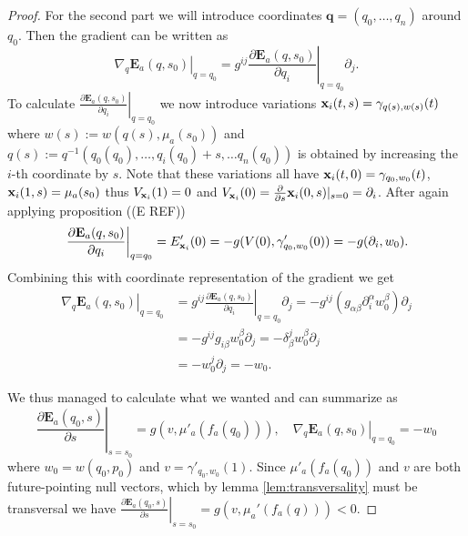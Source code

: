 \begin{proof}
    For the second part we will introduce coordinates $\mathbf{q}=(q_0,\dots,q_n)$ around $q_0$. Then the gradient can be written as
    \[
        \left.\nabla_q\mathbf{E}_a(q,s_0)\right\rvert_{q=q_0} = g^{ij}\left.\frac{\partial\mathbf{E}_a(q,s_0)}{\partial q_i}\right\rvert_{q=q_0}\partial_j.
    \]
    To calculate $\left.\frac{\partial\mathbf{E}_a(q,s_0)}{\partial q_i}\right\rvert_{q=q_0}$ we now introduce variations $\mathbf{x}_i(t,s) = \gamma_{q(s),w(s)}(t)$ where $w(s):=w(q(s),\mu_a(s_0))$ and $q(s):=q^{-1}(q_0(q_0),\dots, q_i(q_0)+s, \dots q_n(q_0))$ is obtained by increasing the $i$-th coordinate by $s$. Note that these variations all have $\mathbf{x}_i(t,0) = \gamma_{q_0,w_0}(t)$, $\mathbf{x}_i(1,s) = \mu_a(s_0)$ thus $V_{\mathbf{x}_i}(1)=0$ and $V_{\mathbf{x}_i}(0) = \frac{\partial}{\partial s}\mathbf{x}_i(0,s)\rvert_{s=0} = \partial_i$.
    After again applying proposition ((E REF))
    \[
        \left.\frac{\partial\mathbf{E}_a(q,s_0)}{\partial q_i}\right\rvert_{q=q_0} = E'_{\mathbf{x}_i}(0) =  -g(V(0),\gamma'_{q_0,w_0}(0)) = -g(\partial_i,w_0).
    \]
    Combining this with coordinate representation of the gradient we get
    \begin{align*}
        \left.\nabla_q\mathbf{E}_a(q,s_0)\right\rvert_{q=q_0} &= g^{ij}\left.\frac{\partial\mathbf{E}_a(q,s_0)}{\partial q_i}\right\rvert_{q=q_0}\partial_j = -g^{ij}(g_{\alpha\beta}\partial_i^\alpha w_0^\beta)\partial_j\\
        &= -g^{ij}g_{i\beta}w_0^\beta\partial_j = -\delta^j_\beta w_0^\beta \partial_j\\
        &= -w_0^j\partial_j = -w_0.
    \end{align*}
    
    We thus managed to calculate what we wanted and can summarize as
    \begin{equation}\label{eq:dEsummary}
        \left.\frac{\partial\mathbf{E}_a(q_0,s)}{\partial s}\right\rvert_{s=s_0} = g(v,\mu'_a(f_a(q_0))), \quad \left.\nabla_q\mathbf{E}_a(q,s_0)\right\rvert_{q=q_0}=-w_0
    \end{equation}
    where $w_0=w(q_0,p_0)$ and $v=\gamma'_{q_0,w_0}(1)$. Since $\mu'_a(f_a(q_0))$ and $v$ are both future-pointing null vectors, which by lemma \ref{lem:transversality} must be transversal we have $\left.\frac{\partial\mathbf{E}_a(q_0,s)}{\partial s}\right\rvert_{s=s_0}=g(v,\mu_a'(f_a(q)))<0$.


\end{proof}
